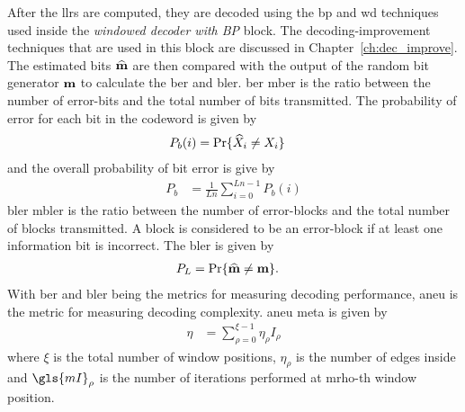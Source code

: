 After the \glspl{llr} are computed, they are decoded using the \gls{bp} and \gls{wd} techniques used inside the \emph{windowed decoder with BP} block. The decoding-improvement techniques that are used in this block are discussed in Chapter~\ref{ch:dec_improve}. The estimated bits $\widehat{\mathbf{m}}$ are then compared with the output of the random bit generator $\mathbf{m}$ to calculate the \gls{ber} and \gls{bler}. \gls{ber} \gls{mber} is the ratio between the number of error-bits and the total number of bits transmitted. The probability of error for each bit in the codeword is given by
\begin{align}
P_b(i)&=\text{Pr}\{\widehat{X}_i\neq X_i\}
\end{align}
and the overall probability of bit error is give by
\begin{align}
P_b&=\frac{1}{Ln}\sum_{i=0}^{Ln-1}P_b(i)\label{eq:indiv_prob}
\end{align}
\gls{bler} \gls{mbler} is the ratio between the number of error-blocks and the total number of blocks transmitted. A block is considered to be an error-block if at least one information bit is incorrect. The \gls{bler} is given by
\begin{align}
P_L&=\text{Pr}\{\widehat{\mathbf{m}}\neq \mathbf{m}\}.
\end{align}
With \gls{ber} and \gls{bler} being the metrics for measuring decoding performance, \gls{aneu} is the metric for measuring decoding complexity. \gls{aneu} \gls{meta} is given by
\begin{align}
\eta&=\sum_{\rho=0}^{\xi-1}\eta_\rho I_\rho
\end{align}
where $\xi$ is the total number of window positions, $\eta_\rho$ is the number of edges inside and $\gls{mI}_\rho$ is the number of iterations performed at \gls{mrho}-th window position.